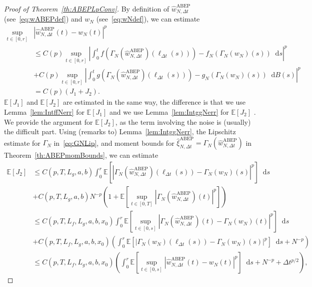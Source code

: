\documentclass[11pt]{amsart}
\newcommand{\E}{{\mathbb E}}
\newcommand*\diff{\mathop{}\!\mathrm{d}}
\newcommand{\xiNDt}{\hat{\xi}_{N,\Delta t}}
\newcommand{\wN}{w_{N}}
\newcommand{\ABEP}{\textrm{ABEP}}
\begin{document}
{\begin{proof}[Proof of Theorem~\ref{th:ABEPLpConv}]
By definition of $\hat{w}_{N,\Delta t}^{\ABEP}$ (see~\eqref{eq:wABEPdef}) and $w_{N}$ (see~\eqref{eq:wNdef}), we can estimate
\begin{equation}\label{eq:wNDtwNerr}
\begin{split}
\sup_{t \in [0,r]} &|\hat{w}_{N,\Delta t}^{\ABEP}(t) - w_{N}(t)|^{p} \\ &\leq C(p) \sup_{t \in [0,r]} \left| \int_{0}^{t} f (\Gamma_{N}( \hat{w}_{N,\Delta t}^{\ABEP})(\ell_{\Delta t}(s))) - f_{N}(\Gamma_{N}(w_{N})(s)) \diff s \right|^{p} \\ &+ C(p) \sup_{t \in [0,r]} \left| \int_{0}^{t} g (\Gamma_{N}(\hat{w}_{N,\Delta t}^{\ABEP})(\ell_{\Delta t}(s))) - g_{N}(\Gamma_{N}(w_{N})(s)) \diff B(s) \right|^{p} \\ &= C(p)(J_{1} + J_{2}).
\end{split}
\end{equation}
$\E \left[ J_{1} \right]$ and $\E \left[ J_{2} \right]$ are estimated in the same way, the difference is that we use Lemma~\ref{lem:IntffNerr} for $\E \left[ J_{1} \right]$ and we use Lemma~\ref{lem:IntggNerr} for $\E \left[ J_{2} \right]$ . We provide the argument for $\E \left[ J_{2} \right]$, as the term involving the noise is (usually) the difficult part. Using (remarks to) Lemma~\ref{lem:IntggNerr}, the Lipschitz estimate for $\Gamma_{N}$ in~\eqref{eq:GNLip}, and moment bounds for $\xiNDt^{\ABEP} = \Gamma_{N}(\hat{w}_{N,\Delta t}^{\ABEP})$ in Theorem~\ref{th:ABEPmomBounds}, we can estimate
\begin{align*}
\E \left[ J_{2} \right] &\leq C(p,T,L_{g},a,b) \int_{0}^{r} \E \left[ |\Gamma_{N}(\hat{w}_{N,\Delta t}^{\ABEP})(\ell_{\Delta t}(s)) - \Gamma_{N}(w_{N})(s)|^{p} \right] \diff s \\ &+ C(p,T,L_{g},a,b) N^{-p} \left(1 + \E \left[ \sup_{t \in [0,T]} |\Gamma_{N}(\hat{w}_{N,\Delta t}^{\ABEP})(t)|^{p} \right] \right) \\ &\leq C(p,T,L_{f},L_{g},a,b,x_{0}) \int_{0}^{r} \E \left[ \sup_{t \in [0,s]} | \Gamma_{N} (\hat{w}_{N,\Delta t}^{\ABEP})(t) - \Gamma_{N}(w_{N})(t)|^{p} \right] \diff s \\ &+ C(p,T,L_{f},L_{g},a,b,x_{0}) \left( \int_{0}^{r} \E \left[ | \Gamma_{N} (\wN)(\ell_{\Delta t}(s)) - \Gamma_{N}(w_{N})(s)|^{p} \right] \diff s + N^{-p} \right) \\ &\leq C(p,T,L_{f},L_{g},a,b,x_{0}) \left( \int_{0}^{r} \E \left[ \sup_{t \in [0,s]} | \hat{w}_{N,\Delta t}^{\ABEP}(t) - w_{N}(t)|^{p} \right] \diff s + N^{-p} + \Delta t^{p/2} \right),
\end{align*}

\end{proof}}
\end{document}
